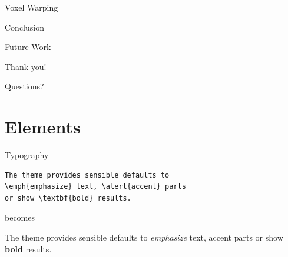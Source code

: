 \documentclass[10pt]{beamer}
\begin{document}
\begin{frame}{Voxel Warping}
\end{frame}

{
\begin{frame}{Conclusion}
\end{frame}}

\begin{frame}{Future Work}
\end{frame}

\begin{frame}{}
  \begin{center}
    \LARGE Thank you!
  \end{center}
\end{frame}

\begin{frame}{}
  \begin{center}
    \LARGE Questions?
  \end{center}
\end{frame}


\section{Elements}

\begin{frame}[fragile]{Typography}
      \begin{verbatim}The theme provides sensible defaults to
\emph{emphasize} text, \alert{accent} parts
or show \textbf{bold} results.\end{verbatim}

  \begin{center}becomes\end{center}

  The theme provides sensible defaults to \emph{emphasize} text,
  \alert{accent} parts or show \textbf{bold} results.
\end{frame}
\end{document}
